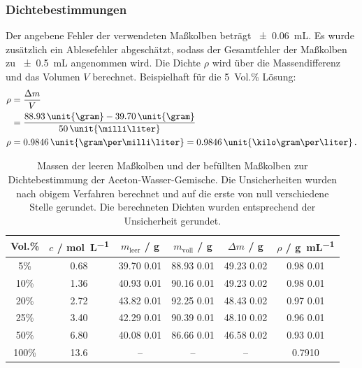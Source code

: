 \subsubsection{Dichtebestimmungen}
Der angebene Fehler der verwendeten Maßkolben beträgt \qty{\pm 0.06}{\milli\liter}.
Es wurde zusätzlich ein Ablesefehler abgeschätzt, sodass der Gesamtfehler der Maßkolben zu \qty{\pm 0.5}{\milli\liter} angenommen wird.
Die Dichte $\rho$ wird über die Massendifferenz und das Volumen $V$ berechnet. Beispielhaft für die 5~Vol.\% Lösung:
\begin{align*}
    \rho &= \frac{\Delta m}{V} \\
         &= \frac{88.93\, \text{\unit{\gram}} - 39.70\, \text{\unit{\gram}}}{50\, \text{\unit{\milli\liter}}} \\
    \rho &= 0.9846\, \text{\unit{\gram\per\milli\liter}} = 0.9846\, \text{\unit{\kilo\gram\per\liter}} \, \text{.}
\end{align*}

\begin{table}[H]
    \centering
    \caption{
        Massen der leeren Maßkolben und der befüllten Maßkolben zur Dichtebestimmung der Aceton-Wasser-Gemische.
        Die Unsicherheiten wurden nach obigem Verfahren berechnet und auf die erste von null verschiedene Stelle gerundet.
        Die berechneten Dichten wurden entsprechend der Unsicherheit gerundet.
    }
    \begin{tabular}{c c c c c c}
        \toprule
        Vol.\% & $c$ / \unit{\mol\per\liter} & $m_{\text{leer}}$ / \unit{\gram} & $m_{\text{voll}}$ / \unit{\gram} & $\Delta m$ / \unit{\gram} & $\rho$ / \unit{\gram\per\milli\liter} \\ \midrule
        5\%   & 0.68 & 39.70 \pm{} 0.01 & 88.93 \pm{} 0.01 & 49.23 \pm{} 0.02 & 0.98 \pm{} 0.01 \\ \midrule
        10\%  & 1.36 & 40.93 \pm{} 0.01 & 90.16 \pm{} 0.01 & 49.23 \pm{} 0.02 & 0.98 \pm{} 0.01 \\ \midrule
        20\%  & 2.72 & 43.82 \pm{} 0.01 & 92.25 \pm{} 0.01 & 48.43 \pm{} 0.02 & 0.97 \pm{} 0.01 \\ \midrule
        25\%  & 3.40 & 42.29 \pm{} 0.01 & 90.39 \pm{} 0.01 & 48.10 \pm{} 0.02 & 0.96 \pm{} 0.01 \\ \midrule 
        50\%  & 6.80 & 40.08 \pm{} 0.01 & 86.66 \pm{} 0.01 & 46.58 \pm{} 0.02 & 0.93 \pm{} 0.01 \\ \midrule
        100\% & 13.6 & -- & -- & -- & 0.7910 \\
        \bottomrule
    \end{tabular}
\end{table}

